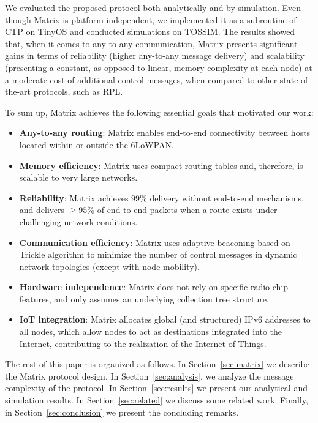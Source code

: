 We evaluated the
proposed protocol both analytically and by simulation. Even though Matrix is
platform-independent, we implemented it as a subroutine of CTP on TinyOS and conducted
simulations on TOSSIM.
The results showed that, when it comes to any-to-any communication, Matrix
presents significant gains in terms of reliability (higher any-to-any message
delivery) and scalability (presenting a
constant, as opposed to linear, memory complexity at each node) at a moderate
cost of additional control messages, when compared to other state-of-the-art
protocols, such as RPL. 


To sum up, Matrix achieves the following essential goals that motivated our work:
\begin{itemize}
  \item \textbf{Any-to-any routing}: Matrix enables end-to-end connectivity
  between hosts located within or outside the 6LoWPAN.
  \item \textbf{Memory efficiency}: Matrix uses compact routing tables and,
  therefore, is scalable to very large networks.
  \item \textbf{Reliability}: Matrix achieves $99\%$ delivery
  without end-to-end mechanisms, and delivers $\geq 95\%$ of
  end-to-end packets when a route exists under challenging network conditions.
  \item \textbf{Communication efficiency}: Matrix uses adaptive beaconing based
  on Trickle algorithm \cite{Levis:2004} to minimize the number of control
  messages in dynamic network topologies (except with node mobility).
  \item \textbf{Hardware independence}: Matrix does not rely on specific radio
  chip features, and only assumes an underlying collection tree structure.
  \item \textbf{IoT integration}: Matrix allocates global (and structured) IPv6
addresses to all nodes, which allow nodes to act as destinations integrated into
the Internet, contributing to the realization of the Internet of Things.
\end{itemize}


The rest of this paper is organized as follows. In
Section~\ref{sec:matrix} we describe the Matrix protocol design. In
Section~\ref{sec:analysis}, we analyze the message complexity of the protocol.
In Section~\ref{sec:results} we present our analytical and simulation results.
In Section~\ref{sec:related} we discuss some related work. Finally, in Section~\ref{sec:conclusion} we present the concluding remarks.
